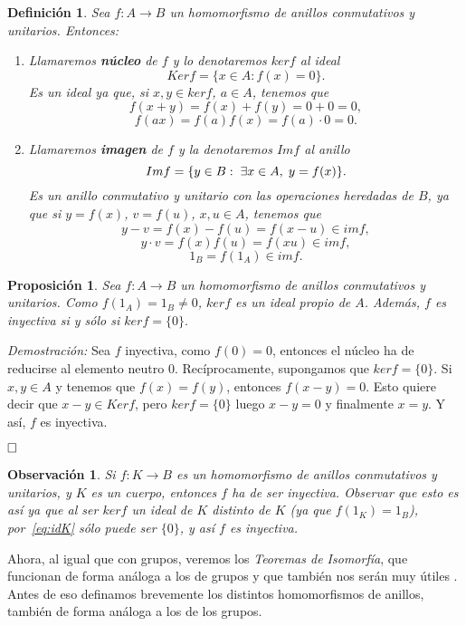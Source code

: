 \documentclass[12pt]{article}
\newtheorem{proposition}[theorem]{Proposición}
\newtheorem{definition}[theorem]{Definición}
\newtheorem{observation}{Observación}[theorem]
\begin{document}
\begin{definition} Sea $f \colon A \longrightarrow B$ un homomorfismo de anillos conmutativos y unitarios. Entonces: \begin{enumerate}
\item Llamaremos \textbf{núcleo} de $f$ y lo denotaremos \textbf{$ker f$} al ideal $$Ker f = \lbrace x \in A:  f(x) = 0 \rbrace.$$ Es un ideal ya que, si $x,y \in ker f$, $a \in A$, tenemos que $$f(x+y) = f(x) + f(y) = 0 +0 = 0,$$ $$f(ax)=f(a) f(x) = f(a) \cdot 0 = 0.$$
\item Llamaremos \textbf{imagen} de $f$ y la denotaremos \textbf{$Im f$} al anillo $$Im f = \lbrace y \in B: \hspace{0.1cm} \exists x \in A, \hspace{0.1cm} y = f(x) \rbrace.$$
Es un anillo conmutativo y unitario con las operaciones heredadas de $B$, ya que si $y = f(x)$, $v = f(u)$, $x, u \in A$, tenemos que $$y-v = f(x) - f(u) = f(x-u) \in im f,$$ $$y \cdot v = f(x)f(u) = f(x u) \in im f,$$ $$1_{B} = f(1_{A}) \in imf.$$
\end{enumerate}
\end{definition}

\begin{proposition} Sea $f \colon A \longrightarrow B$ un homomorfismo de anillos conmutativos y unitarios. Como $f(1_{A}) = 1_{B} \neq 0$, $ker f$ es un ideal propio de $A$. Además, $f$ es inyectiva si y sólo si $ker f = \lbrace 0 \rbrace.$
\end{proposition}
\emph{Demostración: } Sea $f$ inyectiva, como $f(0) = 0$, entonces el núcleo ha de reducirse al elemento neutro $0$. Recíprocamente, supongamos que $ker f = \lbrace 0 \rbrace$. Si $x,y \in A$ y tenemos que $f(x) = f(y)$, entonces $f(x-y)= 0$. Esto quiere decir que $x-y \in Ker f$, pero $ker f = \lbrace 0 \rbrace$ luego $x-y = 0$ y finalmente $x = y$. Y así, $f$ es inyectiva.

$\hfill \square$

\begin{observation} Si $f \colon K \longrightarrow B$ es un homomorfismo de anillos conmutativos y unitarios, y $K$ es un cuerpo, entonces $f$ ha de ser inyectiva. Observar que esto es así ya que al ser $ker f$ un ideal de $K$ distinto de $K$ (ya que $f(1_{K}) = 1_{B}$), por~\ref{eq:idK} sólo puede ser $\lbrace 0 \rbrace$, y así $f$ es inyectiva.
\end{observation}

Ahora, al igual que con grupos, veremos los \textit{Teoremas de Isomorfía}, que funcionan de forma análoga a los de grupos y que también nos serán muy útiles . Antes de eso definamos brevemente los distintos homomorfismos de anillos, también de forma análoga a los de los grupos.
\end{document}
